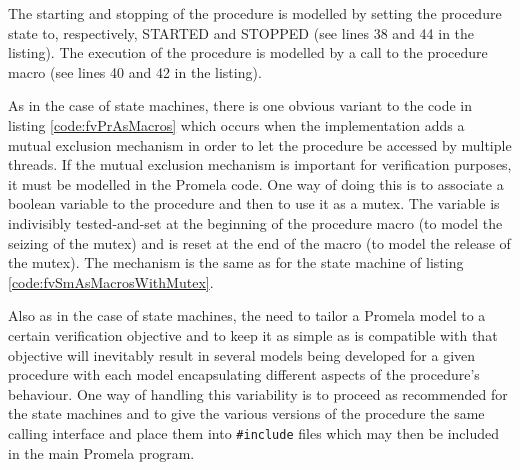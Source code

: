 \documentclass[definition]{../fwprofile}
\begin{document}
The starting and stopping of the procedure is modelled by setting the procedure state to, respectively, STARTED and STOPPED (see lines 38 and 44 in the listing). The execution of the procedure is modelled by a call to the procedure macro (see lines 40 and 42 in the listing).

As in the case of state machines, there is one obvious variant to the code in listing \ref{code:fvPrAsMacros} which occurs when the implementation adds a mutual exclusion mechanism in order to let the procedure be accessed by multiple threads. If the mutual exclusion mechanism is important for verification purposes, it must be modelled in the Promela code. One way of doing this is to associate a boolean variable to the procedure and then to use it as a mutex. The variable is indivisibly tested-and-set at the beginning of the procedure macro (to model the seizing of the mutex) and is reset at the end of the macro (to model the release of the mutex). The mechanism is the same as for the state machine of listing \ref{code:fvSmAsMacrosWithMutex}.

Also as in the case of state machines, the need to tailor a Promela model to a certain verification objective and to keep it as simple as is compatible with that objective will inevitably result in several models being developed for a given procedure with each model encapsulating different aspects of the procedure's behaviour. One way of handling this variability is to proceed as recommended for the state machines and to give the various versions of the procedure the same calling interface and place them into \texttt{\#include} files which may then be included in the main Promela program. 
\end{document}
